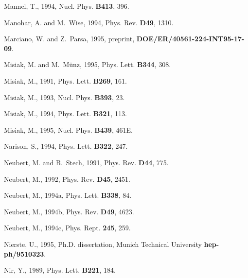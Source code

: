 \begin{thebibliography}{\protect{}1991}
Mannel, T., 1994,
\newblock Nucl. Phys. {\bf B413}, 396.

Manohar, A. and M.~Wise, 1994,
\newblock Phys. Rev. {\bf D49}, 1310.

Marciano, W. and Z.~Parsa, 1995,
\newblock preprint, {\bf DOE/ER/40561-224-INT95-17-09}.

Misiak, M. and M.~M{\"u}nz, 1995,
\newblock Phys. Lett. {\bf B344}, 308.

Misiak, M., 1991,
\newblock Phys. Lett. {\bf B269}, 161.

Misiak, M., 1993,
\newblock Nucl. Phys. {\bf B393}, 23.

Misiak, M., 1994,
\newblock Phys. Lett. {\bf B321}, 113.

Misiak, M., 1995,
\newblock Nucl. Phys. {\bf B439}, 461E.

Narison, S., 1994,
\newblock Phys. Lett. {\bf B322}, 247.

Neubert, M. and B.~Stech, 1991,
\newblock Phys. Rev. {\bf D44}, 775.

Neubert, M., 1992,
\newblock Phys. Rev. {\bf D45}, 2451.

Neubert, M., 1994a,
\newblock Phys. Lett. {\bf B338}, 84.

Neubert, M., 1994b,
\newblock Phys. Rev. {\bf D49}, 4623.

Neubert, M., 1994c,
\newblock Phys. Rept. {\bf 245}, 259.

Nierste, U., 1995,
\newblock Ph.D. dissertation, Munich Technical University {\bf hep-ph/9510323}.

Nir, Y., 1989,
\newblock Phys. Lett. {\bf B221}, 184.


\end{thebibliography}
